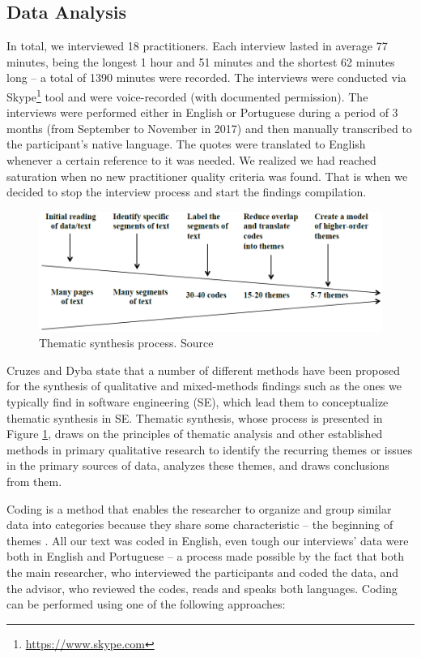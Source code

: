 \subsection{Data Analysis}

In total, we interviewed 18 practitioners. Each interview lasted in average 77 minutes, being the longest 1 hour and 51 minutes and the shortest 62 minutes long -- a total of 1390 minutes were recorded. The interviews were conducted via Skype\footnote{\url{https://www.skype.com}} tool and were voice-recorded (with documented permission). The interviews were performed either in English or Portuguese during a period of 3 months (from September to November in 2017) and then manually transcribed to the participant’s native language. The quotes were translated to English whenever a certain reference to it was needed. We realized we had reached saturation when no new practitioner quality criteria was found. That is when we decided to stop the interview process and start the findings compilation.

\begin{figure}[t]
\centering
\includegraphics[width=.9\textwidth]{images/thematic_synthesis}
\caption{Thematic synthesis process. Source \cite{2011_Cruzes_and_Dyba}}
\label{fig:thematic_synthesis}
\end{figure}

Cruzes and Dyba state \cite{2011_Cruzes_and_Dyba} that a number of different methods have been proposed for the synthesis of qualitative and mixed-methods findings such as the ones we typically find in software engineering (SE), which lead them to conceptualize thematic synthesis in SE. Thematic synthesis, whose process is presented in Figure \ref{fig:thematic_synthesis}, draws on the principles of thematic analysis and other established methods in primary qualitative research to identify the recurring themes or issues in the primary sources of data, analyzes these themes, and draws conclusions from them. 

Coding is a method that enables the researcher to organize and group similar data into categories because they share some characteristic -- the beginning of themes \cite{2011_Cruzes_and_Dyba}. All our text was coded in English, even tough our interviews' data were both in English and Portuguese -- a process made possible by the fact that both the main researcher, who interviewed the participants and coded the data, and the advisor, who reviewed the codes, reads and speaks both languages. Coding can be performed using one of the following approaches:

